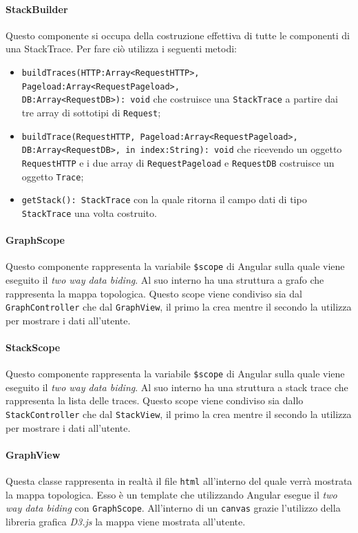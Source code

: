 \paragraph{StackBuilder} \Spazio
Questo componente si occupa della costruzione effettiva di tutte le componenti di una StackTrace. Per fare ciò utilizza i seguenti metodi:
\begin{itemize}
	\item \texttt{buildTraces(HTTP:Array<RequestHTTP>, Pageload:Array<RequestPageload>,\\ DB:Array<RequestDB>): void} che costruisce una \texttt{StackTrace} a partire dai tre array di sottotipi di \texttt{Request};
	\item \texttt{buildTrace(RequestHTTP, Pageload:Array<RequestPageload>,\\ DB:Array<RequestDB>, in index:String): void} che ricevendo un oggetto\\ \texttt{RequestHTTP} e i due array di \texttt{RequestPageload} e \texttt{RequestDB} costruisce un oggetto \texttt{Trace};
	\item \texttt{getStack(): StackTrace} con la quale ritorna il campo dati di tipo \texttt{StackTrace} una volta costruito.
\end{itemize}

\paragraph{GraphScope} \Spazio
Questo componente rappresenta la variabile \texttt{\$scope} di Angular sulla quale viene eseguito il \emph{two way data biding}. Al suo interno ha una struttura a grafo che rappresenta la mappa topologica. Questo scope viene condiviso sia dal \texttt{GraphController} che dal \texttt{GraphView}, il primo la crea mentre il secondo la utilizza per mostrare i dati all'utente.

\paragraph{StackScope} \Spazio
Questo componente rappresenta la variabile \texttt{\$scope} di Angular sulla quale viene eseguito il \emph{two way data biding}. Al suo interno ha una struttura a stack trace che rappresenta la lista delle traces. Questo scope viene condiviso sia dallo \texttt{StackController} che dal \texttt{StackView}, il primo la crea mentre il secondo la utilizza per mostrare i dati all'utente.

\paragraph{GraphView} \Spazio
Questa classe rappresenta in realtà il file \texttt{html} all'interno del quale verrà mostrata la mappa topologica. Esso è un template che utilizzando Angular esegue il \emph{two way data biding} con \texttt{GraphScope}. All'interno di un \texttt{canvas} grazie l'utilizzo della libreria grafica \emph{D3.js} la mappa viene mostrata all'utente.

